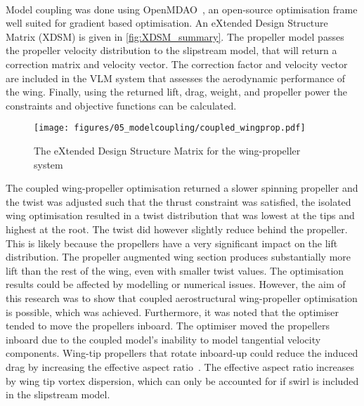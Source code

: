 \\
Model coupling was done using OpenMDAO~\cite{Gray2019a}, an open-source optimisation frame well suited for gradient based optimisation. An eXtended Design Structure Matrix (XDSM) is given in \autoref{fig:XDSM_summary}. The propeller model passes the propeller velocity distribution to the slipstream model, that will return a correction matrix and velocity vector. The correction factor and velocity vector are included in the VLM system that assesses the aerodynamic performance of the wing. Finally, using the returned lift, drag, weight, and propeller power the constraints and objective functions can be calculated.

\begin{figure}[!ht]
    \centering
    \texttt{[image: figures/05\_modelcoupling/coupled\_wingprop.pdf]}
    \caption{The eXtended Design Structure Matrix for the wing-propeller system}
    \label{fig:XDSM_summary}
\end{figure}

The coupled wing-propeller optimisation returned a slower spinning propeller and the twist was adjusted such that the thrust constraint was satisfied, the isolated wing optimisation resulted in a twist distribution that was lowest at the tips and highest at the root. The twist did however slightly reduce behind the propeller. This is likely because the propellers have a very significant impact on the lift distribution. The propeller augmented wing section produces substantially more lift than the rest of the wing, even with smaller twist values. The optimisation results could be affected by modelling or numerical issues. However, the aim of this research was to show that coupled aerostructural wing-propeller optimisation is possible, which was achieved. Furthermore, it was noted that the optimiser tended to move the propellers inboard. The optimiser moved the propellers inboard due to the coupled model's inability to model tangential velocity components. Wing-tip propellers that rotate inboard-up could reduce the induced drag by increasing the effective aspect ratio~\cite{sinnige2018aerodynamic}. The effective aspect ratio increases by wing tip vortex dispersion, which can only be accounted for if swirl is included in the slipstream model.

